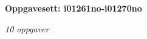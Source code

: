\centerline{\bf Oppgavesett: i01261no-i01270no}
\vskip 10pt
\centerline{\it 10 oppgaver}\vskip 10pt
\vskip 10pt
